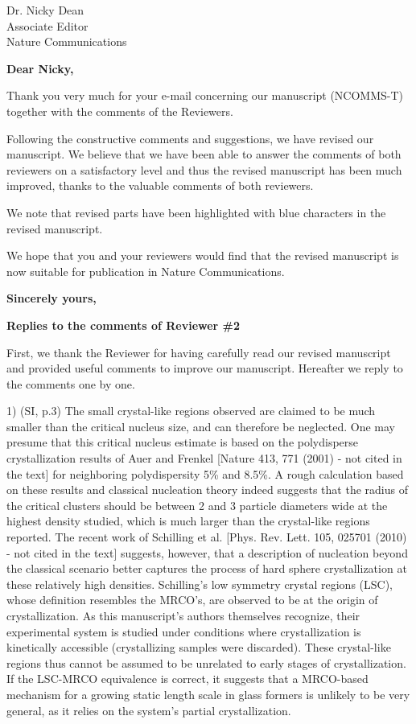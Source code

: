 \documentclass[a4paper, rebuttal, parskip=true, firsthead=false, fromemail=true, foldmarks=false]{scrlttr2}
\begin{document}
 
\begin{letter}{Dr. Nicky Dean\\
Associate Editor\\
Nature Communications}
\opening{\bf Dear Nicky,}

Thank you very much for your e-mail concerning our manuscript (NCOMMS\nobreakdash-T) together with the comments of the Reviewers. 

Following the constructive comments and suggestions, we have revised our manuscript. 
We believe that we have been able to answer the comments of both reviewers on a satisfactory level and thus 
the revised manuscript has been much improved, thanks to the valuable comments of both reviewers. 

We note that revised parts have been highlighted with blue characters in the revised manuscript. 

We hope that you and your reviewers would find that the revised manuscript is now suitable for publication in Nature Communications. 

\closing{\bf Sincerely yours,} 
\clearpage

\textsf{\textbf{Replies to the comments of Reviewer \#2}}

First, we thank the Reviewer for having carefully read our revised manuscript and provided useful comments to improve our manuscript. 
Hereafter we reply to the comments one by one. 

\begin{quotationi}
1) (SI, p.3) The small crystal-like regions observed are claimed to be much smaller than the critical nucleus size, and can therefore be neglected. One may presume that this critical nucleus estimate is based on the polydisperse crystallization results of Auer and Frenkel [Nature 413, 771 (2001) - not cited in the text] for neighboring polydispersity 5\% and 8.5\%. A rough calculation based on these results and classical nucleation theory indeed suggests that the radius of the critical clusters should be between 2 and 3 particle diameters wide at the highest density studied, which is much larger than the crystal-like regions reported. The recent work of Schilling et al. [Phys. Rev. Lett. 105, 025701 (2010) - not cited in the text] suggests, however, that a description of nucleation beyond the classical scenario better captures the process of hard sphere crystallization at these relatively high densities. Schilling's low symmetry crystal regions (LSC), whose definition resembles the MRCO's, are observed to be at the origin of crystallization. As this manuscript's authors themselves recognize, their experimental system is studied under conditions where crystallization is kinetically accessible (crystallizing samples were discarded). These crystal-like regions thus cannot be assumed to be unrelated to early stages of crystallization. If the LSC-MRCO equivalence is correct, it suggests that a MRCO-based mechanism for a growing static length scale in glass formers is unlikely to be very general, as it relies on the system's partial crystallization.
\end{quotationi}


\end{letter}
\end{document}
